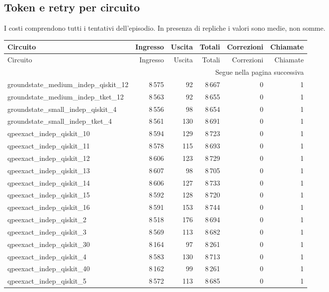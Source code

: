 \subsection{Token e retry per circuito}
I costi comprendono tutti i tentativi dell’episodio. In presenza di repliche i valori sono medie, non somme.
\begingroup\footnotesize
\setlength{\tabcolsep}{5pt}
\begin{longtable}{lrrrrr}
\toprule
Circuito & Ingresso & Uscita & Totali & Correzioni & Chiamate \\
\midrule
\endfirsthead
\toprule
Circuito & Ingresso & Uscita & Totali & Correzioni & Chiamate \\
\midrule\endhead
\midrule\multicolumn{6}{r}{\footnotesize Segue nella pagina successiva}\\
\endfoot
\bottomrule\endlastfoot
groundstate\_medium\_indep\_qiskit\_12 & 8\,575 & 92 & 8\,667 & 0 & 1 \\
groundstate\_medium\_indep\_tket\_12 & 8\,563 & 92 & 8\,655 & 0 & 1 \\
groundstate\_small\_indep\_qiskit\_4 & 8\,556 & 98 & 8\,654 & 0 & 1 \\
groundstate\_small\_indep\_tket\_4 & 8\,561 & 130 & 8\,691 & 0 & 1 \\
qpeexact\_indep\_qiskit\_10 & 8\,594 & 129 & 8\,723 & 0 & 1 \\
qpeexact\_indep\_qiskit\_11 & 8\,578 & 115 & 8\,693 & 0 & 1 \\
qpeexact\_indep\_qiskit\_12 & 8\,606 & 123 & 8\,729 & 0 & 1 \\
qpeexact\_indep\_qiskit\_13 & 8\,607 & 98 & 8\,705 & 0 & 1 \\
qpeexact\_indep\_qiskit\_14 & 8\,606 & 127 & 8\,733 & 0 & 1 \\
qpeexact\_indep\_qiskit\_15 & 8\,592 & 128 & 8\,720 & 0 & 1 \\
qpeexact\_indep\_qiskit\_16 & 8\,591 & 153 & 8\,744 & 0 & 1 \\
qpeexact\_indep\_qiskit\_2 & 8\,518 & 176 & 8\,694 & 0 & 1 \\
qpeexact\_indep\_qiskit\_3 & 8\,569 & 113 & 8\,682 & 0 & 1 \\
qpeexact\_indep\_qiskit\_30 & 8\,164 & 97 & 8\,261 & 0 & 1 \\
qpeexact\_indep\_qiskit\_4 & 8\,583 & 130 & 8\,713 & 0 & 1 \\
qpeexact\_indep\_qiskit\_40 & 8\,162 & 99 & 8\,261 & 0 & 1 \\
qpeexact\_indep\_qiskit\_5 & 8\,572 & 113 & 8\,685 & 0 & 1 \\

\end{longtable}
